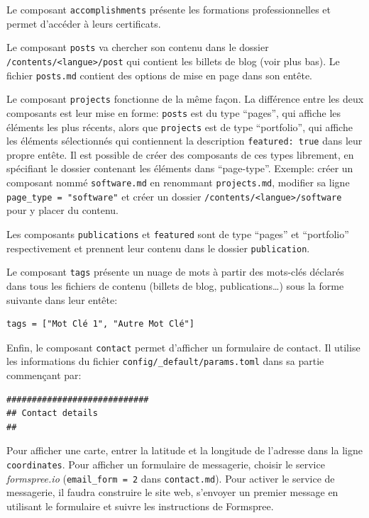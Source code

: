 \documentclass[
  12pt,
  french,
  a4paper,
  extrafontsizes,onecolumn,openright
  ]{memoir}
\begin{document}
Le composant \texttt{accomplishments} présente les formations professionnelles et permet d'accéder à leurs certificats.

Le composant \texttt{posts} va chercher son contenu dans le dossier \texttt{/contents/\textless{}langue\textgreater{}/post} qui contient les billets de blog (voir plus bas).
Le fichier \texttt{posts.md} contient des options de mise en page dans son entête.

Le composant \texttt{projects} fonctionne de la même façon.
La différence entre les deux composants est leur mise en forme: \texttt{posts} est du type \enquote{pages}, qui affiche les éléments les plus récents, alors que \texttt{projects} est de type \enquote{portfolio}, qui affiche les éléments sélectionnés qui contiennent la description \texttt{featured:\ true} dans leur propre entête.
Il est possible de créer des composants de ces types librement, en spécifiant le dossier contenant les éléments dans \enquote{page-type}.
Exemple: créer un composant nommé \texttt{software.md} en renommant \texttt{projects.md}, modifier sa ligne \texttt{page\_type\ =\ "software"} et créer un dossier \texttt{/contents/\textless{}langue\textgreater{}/software} pour y placer du contenu.

Les composants \texttt{publications} et \texttt{featured} sont de type \enquote{pages} et \enquote{portfolio} respectivement et prennent leur contenu dans le dossier \texttt{publication}.

Le composant \texttt{tags} présente un nuage de mots à partir des mots-clés déclarés dans tous les fichiers de contenu (billets de blog, publications\ldots) sous la forme suivante dans leur entête:

\begin{verbatim}
tags = ["Mot Clé 1", "Autre Mot Clé"]
\end{verbatim}

Enfin, le composant \texttt{contact} permet d'afficher un formulaire de contact.
Il utilise les informations du fichier \texttt{config/\_default/params.toml} dans sa partie commençant par:

\begin{verbatim}
############################
## Contact details
##
\end{verbatim}

Pour afficher une carte, entrer la latitude et la longitude de l'adresse dans la ligne \texttt{coordinates}.
Pour afficher un formulaire de messagerie, choisir le service \emph{formspree.io} (\texttt{email\_form\ =\ 2} dans \texttt{contact.md}).
Pour activer le service de messagerie, il faudra construire le site web, s'envoyer un premier message en utilisant le formulaire et suivre les instructions de Formspree.
\end{document}
